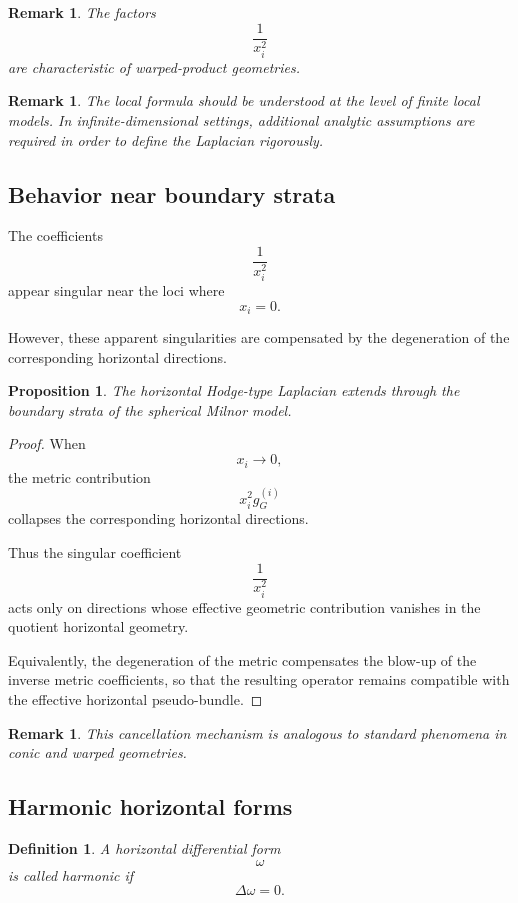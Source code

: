 \documentclass[11pt]{amsart}
\newtheorem{proposition}[theorem]{Proposition}
\newtheorem{definition}[theorem]{Definition}
\newtheorem{remark}[theorem]{Remark}
\begin{document}
\begin{remark}
The factors
\[
\frac1{x_i^2}
\]
are characteristic of warped-product geometries.
\end{remark}

\begin{remark}
The local formula should be understood at the level of finite local models.
In infinite-dimensional settings, additional analytic assumptions are required
in order to define the Laplacian rigorously.
\end{remark}

\subsection{Behavior near boundary strata}

The coefficients
\[
\frac1{x_i^2}
\]
appear singular near the loci where
\[
x_i=0.
\]

However, these apparent singularities are compensated by the degeneration of
the corresponding horizontal directions.

\begin{proposition}
The horizontal Hodge-type Laplacian extends through the boundary strata of the
spherical Milnor model.
\end{proposition}

\begin{proof}
When
\[
x_i\to0,
\]
the metric contribution
\[
x_i^2g_G^{(i)}
\]
collapses the corresponding horizontal directions.

Thus the singular coefficient
\[
\frac1{x_i^2}
\]
acts only on directions whose effective geometric contribution vanishes in the
quotient horizontal geometry.

Equivalently, the degeneration of the metric compensates the blow-up of the
inverse metric coefficients, so that the resulting operator remains compatible
with the effective horizontal pseudo-bundle.
\end{proof}

\begin{remark}
This cancellation mechanism is analogous to standard phenomena in conic and
warped geometries.
\end{remark}

\subsection{Harmonic horizontal forms}

\begin{definition}
A horizontal differential form
\[
\omega
\]
is called harmonic if
\[
\Delta\omega=0.
\]
\end{definition}
\end{document}
